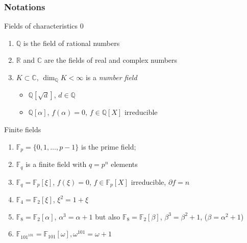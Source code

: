 \documentclass[10pt,handout]{beamer} %
\newcommand{\Q}{\mathbb Q}
\newcommand{\F}{\mathbb F}
\newcommand{\C}{\mathbb C}
\newcommand{\R}{\mathbb R}
\theoremstyle{definition}
\begin{document}
\begin{frame}
 \frametitle{Notations}

\begin{alertblock}{Fields of characteristics 0}
 \begin{enumerate}[<+-| alert@+>]
 \item $\Q$ is the field of rational numbers
\item $\R$ and $\C$ are the fields of real and complex numbers
\item $K\subset\C$, $\dim_\Q K<\infty$ is a \emph{number field}
\begin{itemize}
\item $\Q[\sqrt{d}]$, $d\in\Q$
\item $\Q[\alpha]$, $f(\alpha)=0$, $f\in\Q[X]$
irreducible
\end{itemize}
\end{enumerate}
\end{alertblock}

\begin{exampleblock}{Finite fields}
 \begin{enumerate}[<+-| alert@+>]
 \item $\F_p=\{0,1,\ldots,p-1\}$ is the prime field;
 \item $\F_q$ is a finite field with $q=p^n$ elements
 \item $\F_q=\F_p[\xi]$, $f(\xi)=0$, $f\in\F_p[X]$
irreducible, $\partial f=n$
\item $\F_4=\F_2[\xi]$, $\xi^2=1+\xi$
\item $\F_8=\F_2[\alpha]$, $\alpha^3=\alpha+1$ but also $\F_8=\F_2[\beta]$, $\beta^3=\beta^2+1$, ($\beta=\alpha^2+1$)
\item $\F_{101^{101}}=\F_{101}[\omega], \omega^{101}=\omega+1$
\end{enumerate}
\end{exampleblock}

\end{frame}
\end{document}
